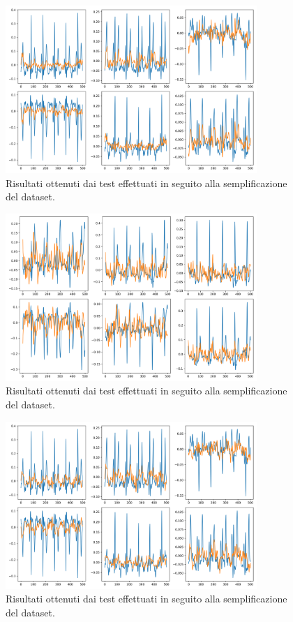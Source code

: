 \documentclass[12pt,italian]{report}
\begin{document}
	\begin{figure}[H]
		\centering
		\includegraphics[width=0.85\textwidth]{immagini/prima_cnn_risultati_secondo_plot_0.png}
		\captionsetup{justification=centering}
		\caption{Risultati ottenuti dai test effettuati in seguito alla semplificazione del dataset.}
		\label{fig:prima_cnn_risultati_secondo_plot_0}
	\end{figure}
	\begin{figure}[H]
		\centering
		\includegraphics[width=0.85\textwidth]{immagini/prima_cnn_risultati_secondo_plot_1.png}
		\captionsetup{justification=centering}
		\caption{Risultati ottenuti dai test effettuati in seguito alla semplificazione del dataset.}
		\label{fig:prima_cnn_risultati_secondo_plot_1}
	\end{figure}
	\begin{figure}[H]
		\centering
		\includegraphics[width=0.85\textwidth]{immagini/seconda_cnn_risultati_secondo_plot_0.png}
		\captionsetup{justification=centering}
		\caption{Risultati ottenuti dai test effettuati in seguito alla semplificazione del dataset.}
		\label{fig:seconda_cnn_risultati_secondo_plot_0}
	\end{figure}
\end{document}
